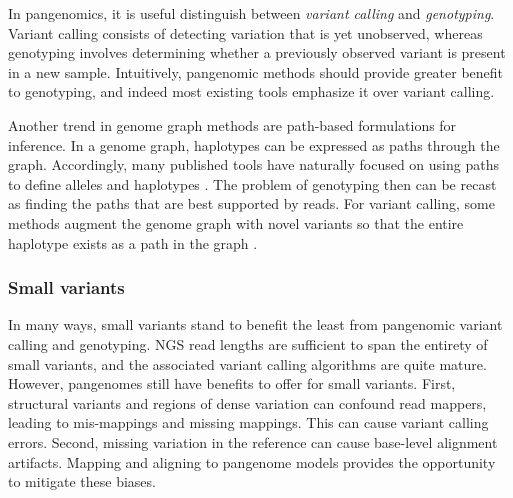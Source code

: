 In pangenomics, it is useful distinguish between \emph{variant calling} and \emph{genotyping}.
Variant calling consists of detecting variation that is yet unobserved, whereas genotyping involves determining whether a previously observed variant is present in a new sample.
Intuitively, pangenomic methods should provide greater benefit to genotyping, and indeed most existing tools emphasize it over variant calling.

Another trend in genome graph methods are path-based formulations for inference.
In a genome graph, haplotypes can be expressed as paths through the graph.
Accordingly, many published tools have naturally focused on using paths to define alleles and haplotypes \cite{dilthey2015improved, sibbesen2018accurate,lee2018kourami,hickey2019genotyping,dolzhenko2019expansionhunter}.
The problem of genotyping then can be recast as finding the paths that are best supported by reads.
For variant calling, some methods augment the genome graph with novel variants so that the entire haplotype exists as a path in the graph \cite{sibbesen2018accurate,lee2018kourami,hickey2019genotyping}.

\subsubsection{Small variants}

In many ways, small variants stand to benefit the least from pangenomic variant calling and genotyping.
NGS read lengths are sufficient to span the entirety of small variants, and the associated variant calling algorithms are quite mature.
However, pangenomes still have benefits to offer for small variants.
First, structural variants and regions of dense variation can confound read mappers, leading to mis-mappings and missing mappings.
This can cause variant calling errors.
Second, missing variation in the reference can cause base-level alignment artifacts.
Mapping and aligning to pangenome models provides the opportunity to mitigate these biases.

